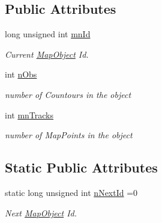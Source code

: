 \subsection*{Public Attributes}
\begin{DoxyCompactItemize}
\item 
long unsigned int \hyperlink{classMapObject_a84a5f3c397f4962cefabe1f295f45d0d}{mn\+Id}\hypertarget{classMapObject_a84a5f3c397f4962cefabe1f295f45d0d}{}\label{classMapObject_a84a5f3c397f4962cefabe1f295f45d0d}

\begin{DoxyCompactList}\small\item\em Current \hyperlink{classMapObject}{Map\+Object} Id. \end{DoxyCompactList}\item 
int \hyperlink{classMapObject_a60fd3486c7fc1c71c72c903b710672fc}{n\+Obs}\hypertarget{classMapObject_a60fd3486c7fc1c71c72c903b710672fc}{}\label{classMapObject_a60fd3486c7fc1c71c72c903b710672fc}

\begin{DoxyCompactList}\small\item\em number of Countours in the object \end{DoxyCompactList}\item 
int \hyperlink{classMapObject_a481f82e1767f4e371df3d204db578eb4}{mn\+Tracks}\hypertarget{classMapObject_a481f82e1767f4e371df3d204db578eb4}{}\label{classMapObject_a481f82e1767f4e371df3d204db578eb4}

\begin{DoxyCompactList}\small\item\em number of Map\+Points in the object \end{DoxyCompactList}\end{DoxyCompactItemize}
\subsection*{Static Public Attributes}
\begin{DoxyCompactItemize}
\item 
static long unsigned int \hyperlink{classMapObject_aa22d23926a9689565fa8567338fe30f2}{n\+Next\+Id} =0\hypertarget{classMapObject_aa22d23926a9689565fa8567338fe30f2}{}\label{classMapObject_aa22d23926a9689565fa8567338fe30f2}

\begin{DoxyCompactList}\small\item\em Next \hyperlink{classMapObject}{Map\+Object} Id. \end{DoxyCompactList}\end{DoxyCompactItemize}
